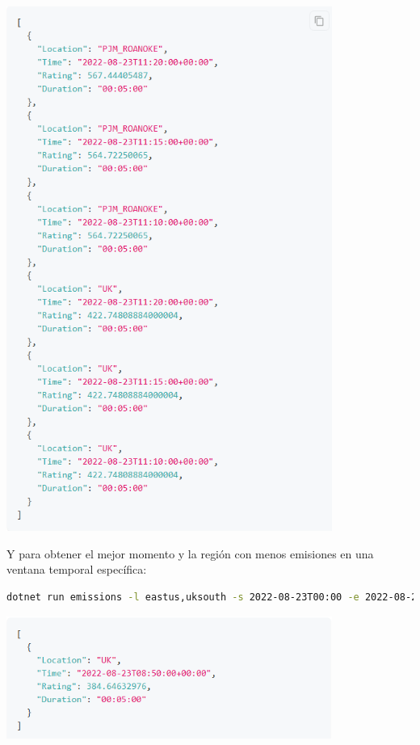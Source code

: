 \documentclass[12pt,a4paper]{report}
\begin{document}
\begin{center}
  \includegraphics[width=0.8\textwidth]{imagenes/CASDK_1.png}
\end{center}

Y para obtener el mejor momento y la región con menos emisiones en una ventana
temporal específica:

\begin{tcolorbox}[colback=codebackground, colframe=codeborder, boxrule=0.8pt, arc=0mm, boxsep=5pt, left=5pt, right=5pt, top=5pt, bottom=5pt]
  \begin{lstlisting}[language=bash]
dotnet run emissions -l eastus,uksouth -s 2022-08-23T00:00 -e 2022-08-23T23:59 --best
\end{lstlisting}
\end{tcolorbox}

\begin{center}
  \includegraphics[width=0.8\textwidth]{imagenes/CASDK_2.png}
\end{center}
\end{document}
